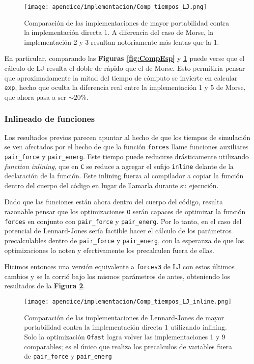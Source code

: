 \begin{figure}[h]
	\centering
	\texttt{[image: apendice/implementacion/Comp\_tiempos\_LJ.png]}
	\caption{Comparación de las implementaciones de mayor portabilidad contra la implementación directa 1. 
	A diferencia del caso de Morse, la implementación 2 y 3 resultan notoriamente más lentas que la 1.}
	\label{fig:CompEsp_LJ}
\end{figure}

En particular, comparando las \textbf{Figuras \ref{fig:CompEsp}} y \textbf{\ref{fig:CompEsp_LJ}} puede verse que el cálculo de LJ resulta el doble de rápido que el de Morse. 
Esto permitiría pensar que aproximadamente la mitad del tiempo de cómputo se invierte en calcular \texttt{exp}, hecho que oculta la diferencia real entre la implementación 1 y 5 de Morse, 
que ahora pasa a ser $\sim 20\%$. 

\subsubsection{Inlineado de funciones}

Los resultados previos parecen apuntar al hecho de que los tiempos de simulación se ven afectados por el hecho de que la función \texttt{forces} llame funciones auxiliares \texttt{pair\_force} 
y \texttt{pair\_energ}. 
Este tiempo puede reducirse drásticamente utilizando \textit{function inlining}, que en \texttt{C} se reduce a agregar el sufijo \texttt{inline} delante de la declaración de la función. 
Este inlining fuerza al compilador a copiar la función dentro del cuerpo del código en lugar de llamarla durante su ejecución. 

Dado que las funciones están ahora dentro del cuerpo del código, resulta razonable pensar que los optimizaciones \texttt{O} serán capaces de optimizar la función \texttt{forces} en conjunto 
con \texttt{pair\_force} y \texttt{pair\_energ}. 
Por lo tanto, en el caso del potencial de Lennard-Jones sería factible hacer el cálculo de los parámetros precalculables dentro de \texttt{pair\_force} y \texttt{pair\_energ}, con la esperanza 
de que los optimizaciones lo noten y efectivamente los precalculen fuera de ellas.

Hicimos entonces una versión equivalente a \texttt{forces3} de LJ con estos últimos cambios y se la corrió bajo los mismos parámetros de antes, obteniendo los resultados de la 
\textbf{Figura \ref{fig:CompEsp_LJ_inline}}.

\begin{figure}[h]
	\centering
	\texttt{[image: apendice/implementacion/Comp\_tiempos\_LJ\_inline.png]}
	\caption{Comparación de las implementaciones de Lennard-Jones de mayor portabilidad contra la implementación directa 1 utilizando inlining. 
	Solo la optimización \texttt{Ofast} logra volver las implementaciones 1 y 9 comparables; es el único que realiza los precalculos de variables fuera de \texttt{pair\_force} y \texttt{pair\_energ}}
	\label{fig:CompEsp_LJ_inline}
\end{figure}

